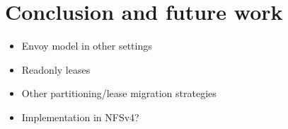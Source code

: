 \documentclass[a4paper]{article}
\begin{document}
\section{Conclusion and future work}
\begin{itemize}
\item Envoy model in other settings
\item Readonly leases
\item Other partitioning/lease migration strategies
\item Implementation in NFSv4?
\end{itemize}

\nocite{*}
%
\end{document}
